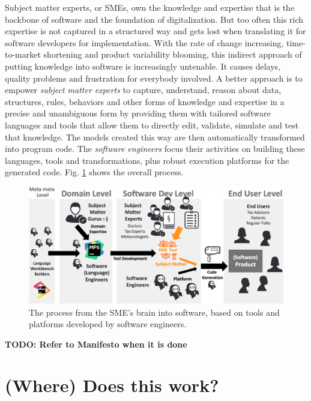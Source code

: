 \documentclass[runningheads]{llncs}
\newcommand{\fig}[1]{Fig. \ref{#1}}  %
\newcommand\todo[1]{\vspace{1mm}\noindent\textbf{\color{red} {{TODO: {#1}} }}}
\begin{document}
Subject matter experts, or SMEs, own the knowledge and expertise that is the
backbone of software and the foundation of digitalization. But too often this
rich expertise is not captured in a structured way and gets lost when
translating it for software developers for implementation. With the rate of
change increasing, time-to-market shortening and product variability blooming,
this indirect approach of putting knowledge into software is increasingly
untenable. It causes delays, quality problems and frustration for everybody
involved. A better approach is to empower \emph{subject matter experts} to
capture, understand, reason about data, structures, rules, behaviors and other
forms of knowledge and expertise in a precise and unambiguous form by providing
them with tailored software languages and tools that allow them to directly
edit, validate, simulate and test that knowledge. The models created this way
are then automatically transformed into program code. The \emph{software
engineers} focus their activities on building these languages, tools and
transformations, plus robust execution platforms for the generated code.
\fig{bigpic} shows the overall process.

\begin{figure}
\begin{center}
    \includegraphics[width=1\columnwidth]{figures/bigpic.png}
    \caption{The process from the SME's brain into software, based on
    tools and platforms developed by software engineers.}
    \label{bigpic}
\end{center} 
\end{figure} 

\todo{Refer to Manifesto when it is done}

\section{(Where) Does this work?}
\end{document}
